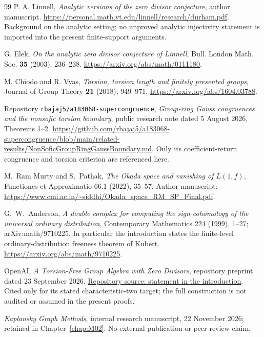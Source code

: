 \documentclass[11pt,a4paper,oneside]{report}
\theoremstyle{definition}
\theoremstyle{remark}
\begin{document}
\begin{thebibliography}{99}
P. A. Linnell,
\emph{Analytic versions of the zero divisor conjecture},
author manuscript.
\url{https://personal.math.vt.edu/linnell/research/durham.pdf}.
Background on the analytic setting; no unproved analytic injectivity
statement is imported into the present finite-support arguments.

G. Elek, \emph{On the analytic zero divisor conjecture of Linnell},
Bull. London Math. Soc. \textbf{35} (2003), 236--238.
\url{https://arxiv.org/abs/math/0111180}.

M. Chiodo and R. Vyas,
\emph{Torsion, torsion length and finitely presented groups},
Journal of Group Theory \textbf{21} (2018), 949--971.
\url{https://arxiv.org/abs/1604.03788}.

Repository \texttt{rbajaj5/a183068-supercongruence}, \emph{Group-ring Gauss congruences and the nonsofic torsion boundary}, public research note dated 5 August 2026, Theorems 1--2. \url{https://github.com/rbajaj5/a183068-supercongruence/blob/main/related-results/NonSoficGroupRingGaussBoundary.md}. Only its coefficient-return congruence and torsion criterion are referenced here.

M.~Ram Murty and S.~Pathak, \emph{The Okada space and vanishing of
$L(1,f)$}, Functiones et Approximatio 66.1 (2022), 35--57.
Author manuscript:
\url{https://www.cmi.ac.in/~siddhi/Okada_space_RM_SP_Final.pdf}.

G.~W.~Anderson, \emph{A double complex for computing the sign-cohomology
of the universal ordinary distribution}, Contemporary Mathematics
224 (1999), 1--27; arXiv:math/9710225. In particular the introduction
states the finite-level ordinary-distribution freeness theorem of Kubert.
\url{https://arxiv.org/abs/math/9710225}.

OpenAI, \emph{A Torsion-Free Group Algebra with Zero Divisors},
repository preprint dated 23 September 2026.
\href{https://github.com/openai/math/blob/main/preprints/A-Torsion-Free-Group-Algebra-with-Zero-Divisors-September-23-2026/build/paper.tex}{Repository source: statement in the introduction}.
Cited only for its stated characteristic-two target; the full
construction is not audited or assumed in the present proofs.

\emph{Kaplansky Graph Methods}, internal research
manuscript, 22 November 2026; retained in Chapter~\ref{chap:M02}.
No external publication or peer-review claim.


\end{thebibliography}
\end{document}
